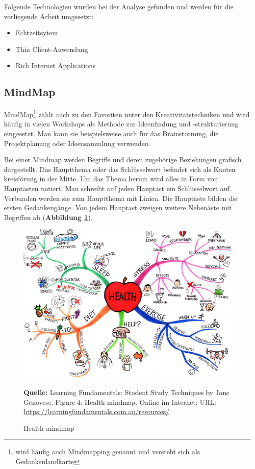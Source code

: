 Folgende Technologien wurden bei der Analyse gefunden und werden für die vorliegende Arbeit umgesetzt: 
\begin{itemize}
\item Echtzeitsytem
\item Thin Client-Anwendung
\item Rich Internet Applications
\end{itemize}

\subsection{MindMap}
\label{sec:mindmap}
MindMap\footnote{wird häufig auch Mindmapping genannt und versteht sich als Gedankenlandkarte} zählt auch zu den Favoriten unter den Kreativitätstechniken und wird häufig in vielen Workshops als Methode zur Ideenfindung und -strukturierung eingesetzt. Man kann sie beispielsweise auch für das Brainstorming, die Projektplanung oder Ideensammlung verwenden.\bigskip

Bei einer Mindmap werden Begriffe und deren zugehörige Beziehungen grafisch dargestellt. Das Hauptthema oder das Schlüsselwort befindet sich als Knoten kreisförmig in der Mitte. Um das Thema herum wird alles in Form von Hauptästen notiert. Man schreibt auf jeden Hauptast ein Schlüsselwort auf. Verbunden werden sie zum Hauptthema mit Linien. Die Hauptäste bilden die ersten Gedankengänge. Von jedem Hauptast zweigen weitere Nebenäste mit Begriffen ab (\textbf{Abbildung \ref{fig:mindmap}}). 

\begin{figure}[H]
  \begin{center}
    \includegraphics[scale=1.8]{img/health-mindmap}
	\caption{Health mindmap} 
	\footnotesize\sffamily\textbf{Quelle:} Learning Fundamentals: Student Study Techniques by Jane Genovese, Figure 4: Health
mindmap. Online im Internet: URL: \url{https://learningfundamentals.com.au/resources/}  
	\label{fig:mindmap}
  \end{center}   
\end{figure}


